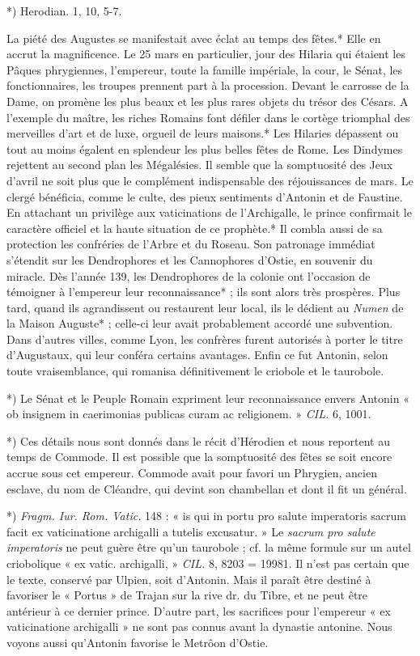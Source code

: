 \documentclass[a4paper, 11pt, oneside, polutonikogreek, french]{article}
\begin{document}
*) Herodian. 1, 10, 5-7.

La piété des Augustes se manifestait avec éclat au temps des fêtes.* Elle en accrut la magnificence. Le 25 mars en particulier, jour des Hilaria qui étaient les Pâques phrygiennes, l'empereur, toute la famille impériale, la cour, le Sénat, les fonctionnaires, les troupes prennent part à la procession. Devant le carrosse de la Dame, on promène les plus beaux et les plus rares objets du trésor des Césars. A l'exemple du maître, les riches Romains font défiler dans le cortège triomphal des merveilles d'art et de luxe, orgueil de leurs maisons.* Les Hilaries dépassent ou tout au moins égalent en splendeur les plus belles fêtes de Rome. Les Dindymes rejettent au second plan les Mégalésies. Il semble que la somptuosité des Jeux d'avril ne soit plus que le complément indispensable des réjouissances de mars. Le clergé bénéficia, comme le culte, des pieux sentiments d'Antonin et de Faustine. En attachant un privilège aux vaticinations de l'Archigalle, le prince confirmait le caractère officiel et la haute situation de ce prophète.* Il combla aussi de sa protection les confréries de l'Arbre et du Roseau. Son patronage immédiat s'étendit sur les Dendrophores et les Cannophores d'Ostie, en souvenir du miracle. Dès l'année 139, les Dendrophores de la colonie ont l'occasion de témoigner à l'empereur leur reconnaissance* ; ils sont alors très prospères. Plus tard, quand ils agrandissent ou restaurent leur local, ils le dédient au \emph{Numen} de la Maison Auguste* ; celle-ci leur avait probablement accordé une subvention. Dans d'autres villes, comme Lyon, les confrères furent autorisés à porter le titre d'Augustaux, qui leur conféra certains avantages. Enfin ce fut Antonin, selon toute vraisemblance, qui romanisa définitivement le criobole et le taurobole.

*) Le Sénat et le Peuple Romain expriment leur reconnaissance envers Antonin « ob insignem in caerimonias publicas curam ac religionem. » \emph{CIL.} 6, 1001.

*) Ces détails nous sont donnés dans le récit d'Hérodien et nous reportent au temps de Commode. Il est possible que la somptuosité des fêtes se soit encore accrue sous cet empereur. Commode avait pour favori un Phrygien, ancien esclave, du nom de Cléandre, qui devint son chambellan et dont il fit un général.

*) \emph{Fragm. Iur. Rom. Vatic.} 148 : « is qui in portu pro salute imperatoris sacrum facit ex vaticinatione archigalli a tutelis excusatur. » Le \emph{sacrum pro salute imperatoris} ne peut guère être qu'un taurobole ; cf. la même formule sur un autel criobolique « ex vatic. archigalli, » \emph{CIL.} 8, 8203 = 19981. Il n'est pas certain que le texte, conservé par Ulpien, soit d'Antonin. Mais il paraît être destiné à favoriser le « Portus » de Trajan sur la rive dr. du Tibre, et ne peut être antérieur à ce dernier prince. D'autre part, les sacrifices pour l'empereur « ex vaticinatione archigalli » ne sont pas connus avant la dynastie antonine. Nous voyons aussi qu'Antonin favorise le Metrôon d'Ostie.
\end{document}
